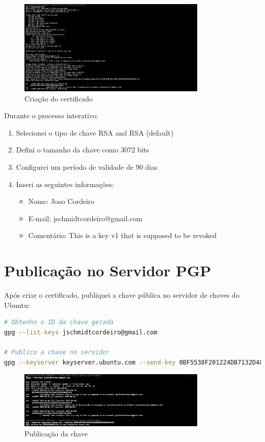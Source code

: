\begin{figure}[!htb]
    \centering
    \includegraphics[width=0.8\textwidth]{images/02-criacao_novo_certificado_pgp.jpg}
    \caption{Criação do certificado}
    \label{fig:criacao-cert}
\end{figure}

Durante o processo interativo:
\begin{enumerate}
    \item Selecionei o tipo de chave RSA and RSA (default)
    \item Defini o tamanho da chave como 3072 bits
    \item Configurei um período de validade de 90 dias
    \item Inseri as seguintes informações:
    \begin{itemize}
        \item Nome: Joao Cordeiro
        \item E-mail: jschmidtcordeiro@gmail.com
        \item Comentário: This is a key v1 that is supposed to be revoked
    \end{itemize}
\end{enumerate}

\section{Publicação no Servidor PGP}
Após criar o certificado, publiquei a chave pública no servidor de chaves do Ubuntu:

\begin{lstlisting}[language=bash]
# Obtenho o ID da chave gerada
gpg --list-keys jschmidtcordeiro@gmail.com

# Publico a chave no servidor
gpg --keyserver keyserver.ubuntu.com --send-key 0BF5538F201224DB7132D486DD9A93D9B6812243
\end{lstlisting}

\begin{figure}[!htb]
    \centering
    \includegraphics[width=0.8\textwidth]{images/02-publicacao_chave_pgp.jpeg}
    \caption{Publicação da chave}
    \label{fig:publicacao-chave}
\end{figure}

